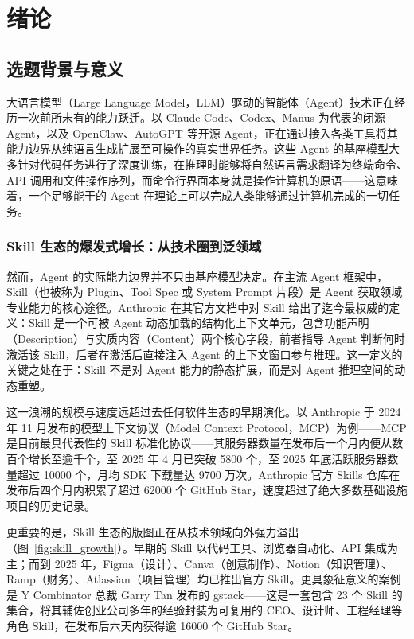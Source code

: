 
\chapter{绪论}
\label{cha:introduction}

\section{选题背景与意义}
\label{sec:background}

大语言模型（Large Language Model，LLM）驱动的智能体（Agent）技术正在经历一次前所未有的能力跃迁。以 Claude Code、Codex、Manus 为代表的闭源 Agent，以及 OpenClaw、AutoGPT 等开源 Agent，正在通过接入各类工具将其能力边界从纯语言生成扩展至可操作的真实世界任务\cite{wangsurveyagents2024,xi2023agentsurvey}。这些 Agent 的基座模型大多针对代码任务进行了深度训练，在推理时能够将自然语言需求翻译为终端命令、API 调用和文件操作序列，而命令行界面本身就是操作计算机的原语——这意味着，一个足够能干的 Agent 在理论上可以完成人类能够通过计算机完成的一切任务。

\subsection{Skill 生态的爆发式增长：从技术圈到泛领域}

然而，Agent 的实际能力边界并不只由基座模型决定。在主流 Agent 框架中，Skill（也被称为 Plugin、Tool Spec 或 System Prompt 片段）是 Agent 获取领域专业能力的核心途径。Anthropic 在其官方文档\cite{anthropic2025skills}中对 Skill 给出了迄今最权威的定义：Skill 是一个可被 Agent 动态加载的结构化上下文单元，包含功能声明（Description）与实质内容（Content）两个核心字段，前者指导 Agent 判断何时激活该 Skill，后者在激活后直接注入 Agent 的上下文窗口参与推理。这一定义的关键之处在于：Skill 不是对 Agent 能力的静态扩展，而是对 Agent 推理空间的动态重塑。

这一浪潮的规模与速度远超过去任何软件生态的早期演化。以 Anthropic 于 2024 年 11 月发布的模型上下文协议（Model Context Protocol，MCP）为例——MCP 是目前最具代表性的 Skill 标准化协议——其服务器数量在发布后一个月内便从数百个增长至逾千个，至 2025 年 4 月已突破 5800 个，至 2025 年底活跃服务器数量超过 10000 个，月均 SDK 下载量达 9700 万次\cite{mcp2025ecosystem}。Anthropic 官方 Skills 仓库在发布后四个月内积累了超过 62000 个 GitHub Star，速度超过了绝大多数基础设施项目的历史记录。

更重要的是，Skill 生态的版图正在从技术领域向外强力溢出（图~\ref{fig:skill_growth}）。早期的 Skill 以代码工具、浏览器自动化、API 集成为主；而到 2025 年，Figma（设计）、Canva（创意制作）、Notion（知识管理）、Ramp（财务）、Atlassian（项目管理）均已推出官方 Skill\cite{anthropic2025skills}。更具象征意义的案例是 Y Combinator 总裁 Garry Tan 发布的 gstack\cite{tan2025gstack}——这是一套包含 23 个 Skill 的集合，将其辅佐创业公司多年的经验封装为可复用的 CEO、设计师、工程经理等角色 Skill，在发布后六天内获得逾 16000 个 GitHub Star。

